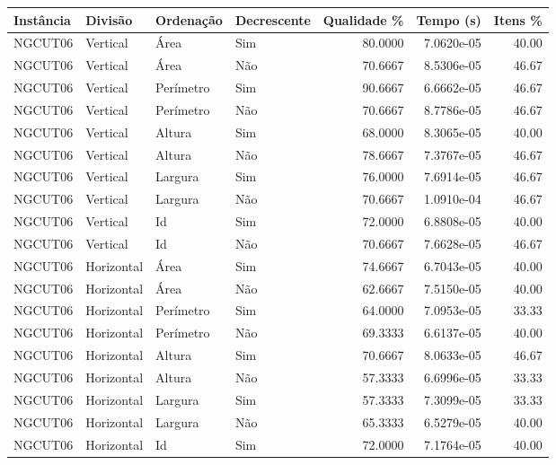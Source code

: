 \begin{tabular}{llllrrr}
\hline
Instância & Divisão     & Ordenação & Decrescente & Qualidade \% & Tempo (s)  & Itens \% \\
\hline
NGCUT06   & Vertical    & Área      & Sim         & 80.0000      & 7.0620e-05 & 40.00    \\
NGCUT06   & Vertical    & Área      & Não         & 70.6667      & 8.5306e-05 & 46.67    \\
NGCUT06   & Vertical    & Perímetro & Sim         & 90.6667      & 6.6662e-05 & 46.67    \\
NGCUT06   & Vertical    & Perímetro & Não         & 70.6667      & 8.7786e-05 & 46.67    \\
NGCUT06   & Vertical    & Altura    & Sim         & 68.0000      & 8.3065e-05 & 40.00    \\
NGCUT06   & Vertical    & Altura    & Não         & 78.6667      & 7.3767e-05 & 46.67    \\
NGCUT06   & Vertical    & Largura   & Sim         & 76.0000      & 7.6914e-05 & 46.67    \\
NGCUT06   & Vertical    & Largura   & Não         & 70.6667      & 1.0910e-04 & 46.67    \\
NGCUT06   & Vertical    & Id        & Sim         & 72.0000      & 6.8808e-05 & 40.00    \\
NGCUT06   & Vertical    & Id        & Não         & 70.6667      & 7.6628e-05 & 46.67    \\
NGCUT06   & Horizontal  & Área      & Sim         & 74.6667      & 6.7043e-05 & 40.00    \\
NGCUT06   & Horizontal  & Área      & Não         & 62.6667      & 7.5150e-05 & 40.00    \\
NGCUT06   & Horizontal  & Perímetro & Sim         & 64.0000      & 7.0953e-05 & 33.33    \\
NGCUT06   & Horizontal  & Perímetro & Não         & 69.3333      & 6.6137e-05 & 40.00    \\
NGCUT06   & Horizontal  & Altura    & Sim         & 70.6667      & 8.0633e-05 & 46.67    \\
NGCUT06   & Horizontal  & Altura    & Não         & 57.3333      & 6.6996e-05 & 33.33    \\
NGCUT06   & Horizontal  & Largura   & Sim         & 57.3333      & 7.3099e-05 & 33.33    \\
NGCUT06   & Horizontal  & Largura   & Não         & 65.3333      & 6.5279e-05 & 40.00    \\
NGCUT06   & Horizontal  & Id        & Sim         & 72.0000      & 7.1764e-05 & 40.00    \\

\end{tabular}
